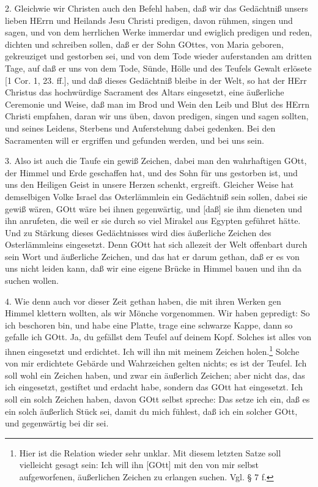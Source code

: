 2. Gleichwie wir Christen auch den Befehl haben, daß wir das Gedächtniß unsers lieben HErrn und Heilands Jesu Christi predigen, davon rühmen, singen und sagen, und von dem herrlichen Werke immerdar und ewiglich predigen und reden, dichten und schreiben sollen, daß er der Sohn GOttes, von Maria geboren, gekreuziget und gestorben sei, und von dem Tode wieder auferstanden am dritten Tage, auf daß er uns von dem Tode, Sünde, Hölle und des Teufels Gewalt erlösete [1 Cor. 1, 23. ff.], und daß dieses Gedächtniß bleibe in der Welt, so hat der HErr Christus das hochwürdige Sacrament des Altars eingesetzt, eine äußerliche Ceremonie und Weise, daß man im Brod und Wein den Leib und Blut des HErrn Christi empfahen, daran wir uns üben, davon predigen, singen und sagen sollten, und seines Leidens, Sterbens und Auferstehung dabei gedenken. Bei den Sacramenten will er ergriffen und gefunden werden, und bei uns sein.

3. Also ist auch die Taufe ein gewiß Zeichen, dabei man den wahrhaftigen GOtt, der Himmel und Erde geschaffen hat, und des Sohn für uns gestorben ist, und uns den Heiligen Geist in unsere Herzen schenkt, ergreift. Gleicher Weise hat demselbigen Volke Israel das Osterlämmlein ein Gedächtniß sein sollen, dabei sie gewiß wären, GOtt wäre bei ihnen gegenwärtig, und [daß] sie ihm dieneten und ihn anrufeten, die weil er sie durch so viel Mirakel aus Egypten geführet hätte. Und zu Stärkung dieses Gedächtnisses wird dies äußerliche Zeichen des Osterlämmleins eingesetzt. Denn GOtt hat
sich allezeit der Welt offenbart durch sein Wort und äußerliche Zeichen, und das hat er darum gethan, daß er es von uns nicht leiden kann, daß wir eine eigene Brücke in Himmel bauen und ihn da suchen wollen.

4. Wie denn auch vor dieser Zeit gethan haben, die mit ihren Werken gen Himmel klettern wollten, als wir Mönche vorgenommen. Wir haben gepredigt: So ich beschoren bin, und habe eine Platte, trage eine schwarze Kappe, dann so gefalle ich GOtt. Ja, du gefällst dem Teufel auf deinem Kopf. Solches ist alles von ihnen eingesetzt und erdichtet. Ich will ihn mit meinem Zeichen holen.\footnote{Hier ist die Relation wieder sehr unklar. Mit diesem letzten Satze soll vielleicht gesagt sein: Ich will ihn [GOtt] mit den von mir selbst aufgeworfenen, äußerlichen Zeichen zu erlangen suchen. Vgl. § 7 f.} Solche von mir erdichtete Gebärde und Wahrzeichen gelten nichts; es ist der Teufel. Ich soll wohl ein Zeichen haben, und zwar ein äußerlich Zeichen; aber nicht das, das ich eingesetzt, gestiftet und erdacht habe, sondern das GOtt hat eingesetzt. Ich soll ein solch Zeichen haben, davon GOtt selbst spreche: Das setze ich ein, daß es ein solch äußerlich Stück sei, damit du mich fühlest, daß ich ein solcher GOtt, und gegenwärtig bei dir sei.


